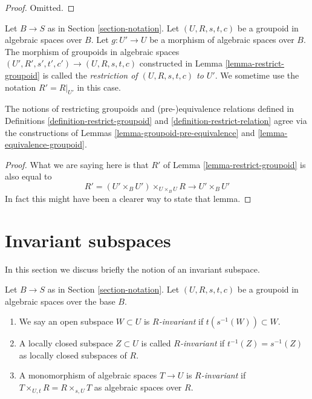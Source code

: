\begin{proof}
Omitted.
\end{proof}

\begin{definition}
\label{definition-restrict-groupoid}
Let $B \to S$ as in Section \ref{section-notation}.
Let $(U, R, s, t, c)$ be a groupoid in algebraic spaces over $B$.
Let $g : U' \to U$ be a morphism of algebraic spaces over $B$.
The morphism of groupoids in algebraic spaces
$(U', R', s', t', c') \to (U, R, s, t, c)$
constructed in Lemma \ref{lemma-restrict-groupoid} is called
the {\it restriction of $(U, R, s, t, c)$ to $U'$}.
We sometime use the notation $R' = R|_{U'}$ in this case.
\end{definition}

\begin{lemma}
\label{lemma-restrict-groupoid-relation}
The notions of restricting groupoids and
(pre-)equivalence relations defined in Definitions
\ref{definition-restrict-groupoid} and \ref{definition-restrict-relation}
agree via the constructions of
Lemmas \ref{lemma-groupoid-pre-equivalence} and
\ref{lemma-equivalence-groupoid}.
\end{lemma}

\begin{proof}
What we are saying here is that $R'$ of
Lemma \ref{lemma-restrict-groupoid} is also
equal to
$$
R' = (U' \times_B U')\times_{U \times_B U} R
\longrightarrow
U' \times_B U'
$$
In fact this might have been a clearer way to state that lemma.
\end{proof}





\section{Invariant subspaces}
\label{section-invariant}

\noindent
In this section we discuss briefly the notion of an invariant subspace.

\begin{definition}
\label{definition-invariant-open}
Let $B \to S$ as in Section \ref{section-notation}.
Let $(U, R, s, t, c)$ be a groupoid in algebraic spaces over the base $B$.
\begin{enumerate}
\item We say an open subspace $W \subset U$ is {\it $R$-invariant} if
$t(s^{-1}(W)) \subset W$.
\item A locally closed subspace $Z \subset U$ is called {\it $R$-invariant}
if $t^{-1}(Z) = s^{-1}(Z)$ as locally closed subspaces of $R$.
\item A monomorphism of algebraic spaces $T \to U$ is {\it $R$-invariant}
if $T \times_{U, t} R = R \times_{s, U} T$ as algebraic spaces over $R$.
\end{enumerate}
\end{definition}

